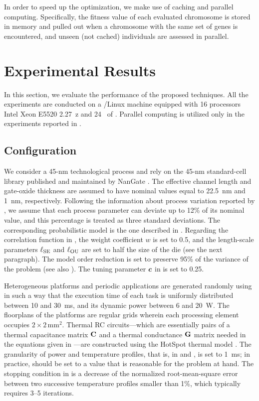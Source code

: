 In order to speed up the optimization, we make use of caching and parallel
computing. Specifically, the fitness value of each evaluated chromosome is
stored in memory and pulled out when a chromosome with the same set of genes is
encountered, and unseen (not cached) individuals are assessed in parallel.

\section{Experimental Results}

In this section, we evaluate the performance of the proposed techniques. All the
experiments are conducted on a /Linux machine equipped with 16
processors Intel Xeon E5520 2.27~z and 24~ of . Parallel
computing is utilized only in the experiments reported in
.

\subsection{Configuration}

We consider a 45-nm technological process and rely on the 45-nm standard-cell
library published and maintained by NanGate \cite{nangate}. The effective
channel length and gate-oxide thickness are assumed to have nominal values equal
to 22.5~nm and 1~nm, respectively. Following the information about process
variation reported by  \cite{itrs}, we assume that each process
parameter can deviate up to 12\% of its nominal value, and this percentage is
treated as three standard deviations. The corresponding probabilistic model is
the one described in . Regarding the correlation function in
, the weight coefficient $w$ is set to 0.5, and the
length-scale parameters $\ell_{\mathrm{SE}}$ and $\ell_{\mathrm{OU}}$ are set to half the size of
the die (see the next paragraph). The model order reduction is set to preserve
95\% of the variance of the problem (see also ). The
tuning parameter $\boldsymbol{c}$ in  is set to 0.25.

Heterogeneous platforms and periodic applications are generated randomly using
 \cite{dick1998} in such a way that the execution time of each task is
uniformly distributed between 10 and 30~ms, and its dynamic power between 6 and
20~W. The floorplans of the platforms are regular grids wherein each processing
element occupies $2 \times 2\,\text{mm}^2$. Thermal RC circuits---which are
essentially pairs of a thermal capacitance matrix $\mathbf{C}$ and a thermal
conductance $\mathbf{G}$ matrix needed in the equations given in
---are constructed using the HotSpot thermal model
\cite{skadron2004}. The granularity of power and temperature profiles, that is,
\dt in  and , is set to
1~ms; in practice, \dt should be set to a value that is reasonable for the
problem at hand. The stopping condition in  is a
decrease of the normalized root-mean-square error between two successive
temperature profiles smaller than 1\%, which typically requires 3--5 iterations.


